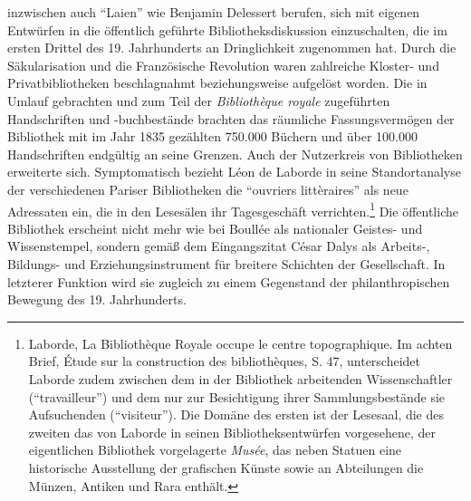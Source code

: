 inzwischen auch \enquote{Laien} wie Benjamin Delessert berufen, sich mit
eigenen Entwürfen in die öffentlich geführte Bibliotheksdiskussion
einzuschalten, die im ersten Drittel des 19. Jahrhunderts an
Dringlichkeit zugenommen hat. Durch die Säkularisation und die
Französische Revolution waren zahlreiche Kloster- und Privatbibliotheken
beschlagnahmt beziehungsweise aufgelöst worden. Die in Umlauf gebrachten
und zum Teil der \emph{Bibliothèque royale} zugeführten Handschriften
und -buchbestände brachten das räumliche Fassungsvermögen der Bibliothek
mit im Jahr 1835 gezählten 750.000 Büchern und über 100.000
Handschriften endgültig an seine Grenzen. Auch der Nutzerkreis von
Bibliotheken erweiterte sich. Symptomatisch bezieht Léon de Laborde in
seine Standortanalyse der verschiedenen Pariser Bibliotheken die
\enquote{ouvriers littèraires} als neue Adressaten ein, die in den
Lesesälen ihr Tagesgeschäft verrichten.\footnote{Laborde, La
  Bibliothèque Royale occupe le centre topographique. Im achten Brief,
  Étude sur la construction des bibliothèques, S. 47, unterscheidet
  Laborde zudem zwischen dem in der Bibliothek arbeitenden
  Wissenschaftler (\enquote{travailleur}) und dem nur zur Besichtigung
  ihrer Sammlungsbestände sie Aufsuchenden (\enquote{visiteur}). Die
  Domäne des ersten ist der Lesesaal, die des zweiten das von Laborde in
  seinen Bibliotheksentwürfen vorgesehene, der eigentlichen Bibliothek
  vorgelagerte \emph{Musée}, das neben Statuen eine historische
  Ausstellung der grafischen Künste sowie an Abteilungen die Münzen,
  Antiken und Rara enthält.} Die öffentliche Bibliothek erscheint nicht
mehr wie bei Boullée als nationaler Geistes- und Wissenstempel, sondern
gemäß dem Eingangszitat César Dalys als Arbeits-, Bildungs- und
Erziehungsinstrument für breitere Schichten der Gesellschaft. In
letzterer Funktion wird sie zugleich zu einem Gegenstand der
philanthropischen Bewegung des 19. Jahrhunderts.

